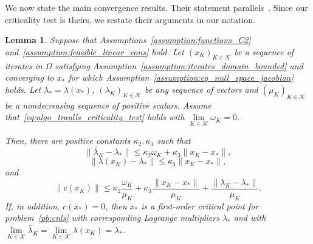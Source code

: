 \documentclass[pdflatex,sn-mathphys-num]{sn-jnl}%
\theoremstyle{thmstyleone}%
\newtheorem{lemma}[theorem]{Lemma}
\newcommand{\calK}{{\mathcal{K}}}
\begin{document}
We now state the main convergence results. Their statement parallels~\cite[Lemma~4.4 and Theorem~4.6]{conn-etal:1996b}. Since our criticality test is theirs, we restate their arguments in our notation. 
\begin{lemma}\label{lemma:key_lemma}
	Suppose that Assumptions~\ref{assumption:functions_C2} and~\ref{assumption:feasible_linear_cons} hold. Let $\left(x_K\right)_{K\in \calK}$ be a sequence of iterates in $\Omega$ satisfying Assumption~\ref{assumption:iterates_domain_bounded} and converging to $x_*$ for which Assumption~\ref{assumption:cq_null_space_jacobian} holds. Let $\lambda_* = \lambda(x_*)$, $(\lambda_K)_{K \in \calK}$ be any sequence of vectors and $(\mu_K)_{K \in \calK}$ be a nondecreasing sequence of positive scalars. Assume that~\eqref{eq:algo_traulls_criticality_test} holds with $\lim\limits_{K \in \calK}\omega_K = 0$.
	
	Then, there are positive constants $\kappa_2, \kappa_3$ such that
	\begin{equation}\label{eq:bound_1st_order_mult}
		\|\bar{\lambda}_K - \lambda_* \| \le \kappa_2 \omega_K + \kappa_3 \|x_K-x_*\|,
	\end{equation}
	\begin{equation}\label{eq:bound_ls_mult}
		\|\lambda(x_K) - \lambda_* \| \le \kappa_3 \|x_K-x_*\|,
	\end{equation}
	and
	\begin{equation}\label{eq:bound_norm_cons}
		\|c(x_K)\| \le \kappa_2 \frac{\omega_K}{\mu_K} + \kappa_3 \frac{\|x_K-x_*\|}{\mu_K} + \frac{\|\lambda_K - \lambda_* \|}{\mu_K}.
	\end{equation}
	If, in addition, $c(x_*) = 0$, then $x_*$ is a first-order critical point for problem~\eqref{pb:cnls} with corresponding Lagrange multipliers $\lambda_*$ and with $\lim\limits_{K \in \calK} \bar{\lambda}_K = \lim\limits_{K \in \calK} \lambda(x_K) = \lambda_*$.
\end{lemma}
\end{document}

